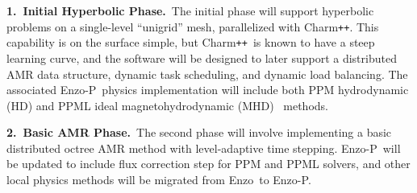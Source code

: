 \documentclass[11pt,letterpaper]{article}
\newcommand{\enzo}{\textsf{Enzo}}
\newcommand{\enzoii}{\textsf{Enzo-P}}
\newcommand{\pp}{\texttt{++}}
\newcommand{\charm}{\textsf{Charm\pp}}
\newcounter{figctr}
\newcommand{\FIGURE}[3]{
\noindent
\parbox{\textwidth}{
\begin{center}
#3
\end{center}%
\ \nolinebreak%
\refstepcounter{figctr}%
\begin{center}%
\begin{minipage}{7.0in}
\textbf{Figure \thefigctr}. #1
\end{minipage}
\end{center}
\label{#2}
}}
\begin{document}
   

\textbf{1.~Initial Hyperbolic Phase.}~The initial phase will support
hyperbolic problems on a single-level ``unigrid'' mesh, parallelized
with \charm.  This capability is on the surface simple, but \charm\ is
known to have a steep learning curve, and the software will be
designed to later support a distributed AMR data structure, dynamic
task scheduling, and dynamic load balancing.  The associated \enzoii\
physics implementation will include both PPM hydrodynamic (HD) and
PPML ideal magnetohydrodynamic (MHD)~\cite{UsPo09} methods.

\textbf{2.~Basic AMR Phase.}~The second phase will involve implementing a
basic distributed octree AMR method with level-adaptive time stepping.
\enzoii\ will be updated to include flux correction step for PPM and
PPML solvers, and other local physics methods will be migrated from
\enzo\ to \enzoii.
\end{document}
